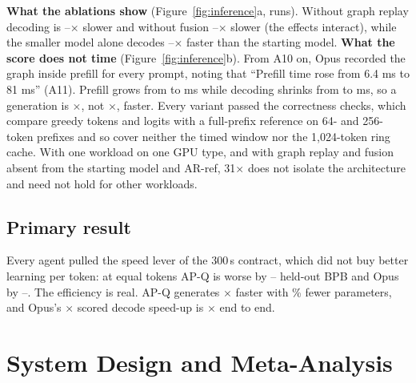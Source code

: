 \documentclass{article}
\newif\ifshowhumanmarkers \showhumanmarkersfalse
\newcommand{\humantag}[1]{{\color{humanframe}\sffamily\scriptsize\bfseries HUMAN AUTHOR MUST REWRITE/VERIFY [#1]}\ }
\newcommand{\humanauthor}[2][]{\ifshowhumanmarkers\begin{humanbox}\humantag{#1}#2\end{humanbox}\else #2\par\fi}
\begin{document}
\textbf{What the ablations show} (Figure~\ref{fig:inference}a, \CRIARuns{} runs). Without graph replay decoding is \CRIAGraphLo--\CRIAGraphHi$\times$ slower and without fusion \CRIAFusionLo--\CRIAFusionHi$\times$ slower (the effects interact), while the smaller model alone decodes \CRIAArchLo--\CRIAArchHi$\times$ faster than the starting model. \textbf{What the score does not time} (Figure~\ref{fig:inference}b). From A10 on, Opus recorded the graph inside prefill for every prompt, noting that ``Prefill time rose from 6.4 ms to 81 ms'' (A11). Prefill grows from \CRThreePreBase{} to \CRThreePreOpus{} ms while decoding shrinks from \CRThreeDecBase{} to \CRThreeDecOpus{} ms, so a generation is \CRThreeEtoEX$\times$, not \CRThreeDecX$\times$, faster. Every variant passed the correctness checks, which compare greedy tokens and logits with a full-prefix reference on 64- and 256-token prefixes and so cover neither the timed window nor the 1{,}024-token ring cache. With one workload on one GPU type, and with graph replay and fusion absent from the starting model and AR-ref, 31$\times$ does not isolate the architecture and need not hold for other workloads.

\subsection{Primary result}
Every agent pulled the speed lever of the 300\,s contract, which did not buy better learning per token: at equal tokens AP-Q is worse by \CREOneMatchedLoAbs--\CREOneMatchedHiAbs{} held-out BPB and Opus by \CRMTDLoAbs--\CRMTDHiAbs. The efficiency is real. AP-Q generates \CRDecodeRatio$\times$ faster with \CRParamReduction\% fewer parameters, and Opus's \CRIATotalMed$\times$ scored decode speed-up is \CRIAEtoEMed$\times$ end to end.
\label{partoneend}

\clearpage
\section{System Design and Meta-Analysis}\label{parttwo}
\end{document}
